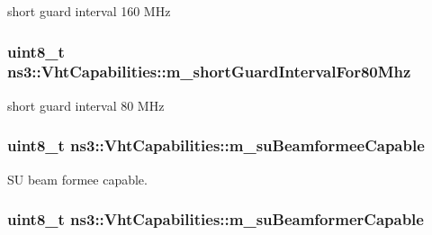 short guard interval 160 M\+Hz 

\subsubsection[{\texorpdfstring{m\+\_\+short\+Guard\+Interval\+For80\+Mhz}{m_shortGuardIntervalFor80Mhz}}]{\setlength{\rightskip}{0pt plus 5cm}uint8\+\_\+t ns3\+::\+Vht\+Capabilities\+::m\+\_\+short\+Guard\+Interval\+For80\+Mhz\hspace{0.3cm}{\ttfamily [private]}}\hypertarget{classns3_1_1VhtCapabilities_a17def5a3281c3fbecb315a9f0ccc2d8d}{}\label{classns3_1_1VhtCapabilities_a17def5a3281c3fbecb315a9f0ccc2d8d}


short guard interval 80 M\+Hz 

\subsubsection[{\texorpdfstring{m\+\_\+su\+Beamformee\+Capable}{m_suBeamformeeCapable}}]{\setlength{\rightskip}{0pt plus 5cm}uint8\+\_\+t ns3\+::\+Vht\+Capabilities\+::m\+\_\+su\+Beamformee\+Capable\hspace{0.3cm}{\ttfamily [private]}}\hypertarget{classns3_1_1VhtCapabilities_aabc73c23623e50a9dba2dfaadf31befa}{}\label{classns3_1_1VhtCapabilities_aabc73c23623e50a9dba2dfaadf31befa}


SU beam formee capable. 

\subsubsection[{\texorpdfstring{m\+\_\+su\+Beamformer\+Capable}{m_suBeamformerCapable}}]{\setlength{\rightskip}{0pt plus 5cm}uint8\+\_\+t ns3\+::\+Vht\+Capabilities\+::m\+\_\+su\+Beamformer\+Capable\hspace{0.3cm}{\ttfamily [private]}}\hypertarget{classns3_1_1VhtCapabilities_a6c6a15832cd47a4c9e48f93edad69b27}{}\label{classns3_1_1VhtCapabilities_a6c6a15832cd47a4c9e48f93edad69b27}



